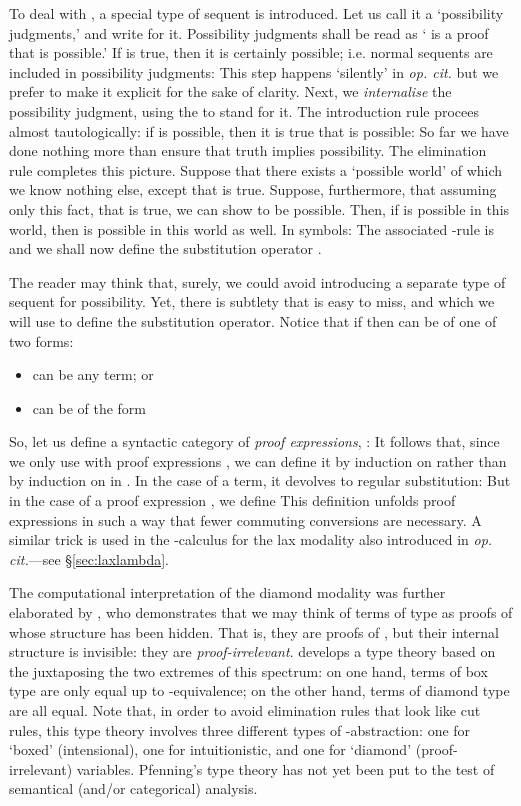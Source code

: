 \documentclass[a4paper]{amsart}
\begin{document}
To deal with , a special type of sequent is introduced.
Let us call it a `possibility judgments,' and write
 for it. Possibility
judgments  shall be read as ` is a proof that
 is possible.' If  is true, then it is certainly possible;
i.e. normal sequents are included in possibility judgments:  This step happens `silently' in \emph{op. cit.} but we prefer
to make it explicit for the sake of clarity. Next, we
\emph{internalise} the possibility judgment, using the 
to stand for it. The introduction rule procees almost
tautologically: if  is possible, then it is true that
 is possible:  So far we have done nothing more than ensure that truth
implies possibility. The elimination rule completes this picture.
Suppose that there exists a `possible world' of which we know
nothing else, except that  is true. Suppose, furthermore, that
assuming only this fact, that  is true, we can show  to be
possible. Then, if  is possible in this world, then  is
possible in this world as well. In symbols:  The associated -rule is  and we shall now define the substitution operator .

The reader may think that, surely, we could avoid introducing a
separate type of sequent for possibility. Yet, there is subtlety
that is easy to miss, and which we will use to define the
substitution operator. Notice that if  then  can be of one of two forms:
\begin{itemize}
  \item  can be any term; or
  \item  can be of the form 
    
\end{itemize} So, let us define a syntactic category of
\emph{proof expressions}, :  It follows that, since we only use  with proof expressions , we can define it by
induction on  rather than by induction on  in
. In the case of a term, it
devolves to regular substitution:  But in the case of a proof expression , we define  This definition unfolds proof expressions in such a way that
fewer commuting conversions are necessary. A similar trick is used
in the -calculus for the lax modality also introduced in
\emph{op. cit.}---see \S \ref{sec:laxlambda}.

The computational interpretation of the diamond modality was
further elaborated by \cite{Pfenning2001}, who demonstrates
that we may think of terms of type  as proofs of 
whose structure has been hidden.  That is, they are proofs of ,
but their internal structure is invisible: they are
\emph{proof-irrelevant}. \cite{Pfenning2001} develops a type
theory based on the juxtaposing the two extremes of this spectrum:
on one hand, terms of box type are only equal up to
-equivalence; on the other hand, terms of diamond type are
all equal. Note that, in order to avoid elimination rules that
look like cut rules, this type theory involves three different
types of -abstraction: one for `boxed' (intensional), one
for intuitionistic, and one for `diamond' (proof-irrelevant)
variables. Pfenning's type theory has not yet been put to the test
of semantical (and/or categorical) analysis.
\end{document}
